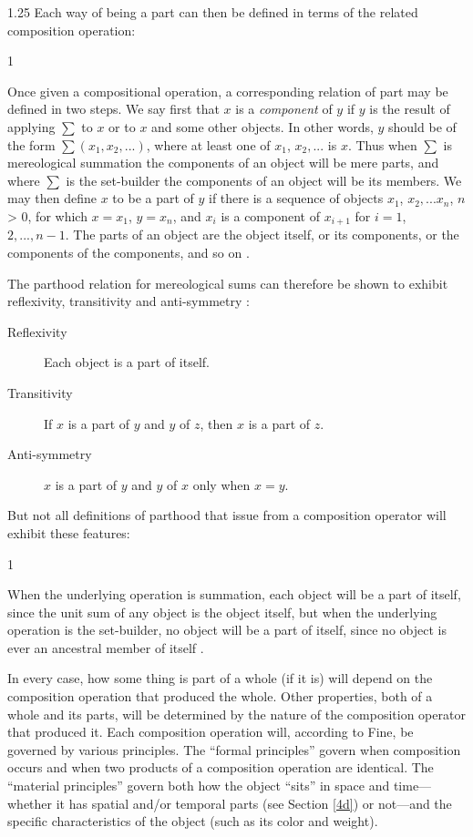 \documentclass[12pt,twoside]{reedfancy}
\newenvironment{squote}{%
	\begin{spacing}{1}
	\begin{list}{}{%
	\setlength{\labelwidth}{0pt}%
	\rightmargin\leftmargin%
	}
	\item\relax
	}{%
	\end{list}%
	\end{spacing}
	}
\begin{document}
\begin{spacing}{1.25}
Each way of being a part can then be defined in terms of the related
composition operation:

\begin{squote}
Once given a compositional operation, a corresponding relation of part
may be defined in two steps.  We say first that $x$ is a {\em
  component} of $y$ if $y$ is the result of applying $\sum$ to $x$ or
to $x$ and some other objects.  In other words, $y$ should be of the
form $\sum (x_{1}, x_{2}, ... )$, where at least one of
$x_1$, $x_2, ...$ is $x$.  Thus when $\sum$ is mereological
summation the components of an object will be mere parts, and where
$\sum$ is the set-builder the components of an object will be its
members.  We may then define $x$ to be a part of $y$ if there is a
sequence of objects $x_1$, $x_2, ... x_n$, $n$
\textgreater{} $0$, for which $x = x_1$, $y = x_n$, and $x_i$ is a
component of $x_{i+1}$ for $i = 1$, $2, ..., n-1$. The parts
of an object are the object itself, or its components, or the
components of the components, and so on \citep[567--568]{fine2010}.
\end{squote}

The parthood relation for mereological sums can therefore be shown to
exhibit reflexivity, transitivity and anti-symmetry
\citep[568]{fine2010}:

\begin{description}
\item[Reflexivity] Each object is a part of itself.
\item[Transitivity] If $x$ is a part of $y$ and $y$ of $z$, then $x$
  is a part of $z$.
\item[Anti-symmetry] $x$ is a part of $y$ and $y$ of $x$ only when $x
  = y$.
\end{description}

But not all definitions of parthood that issue from a composition
operator will exhibit these features:

\begin{squote}
When the underlying operation is summation, each object will be a part
of itself, since the unit sum of any object is the object itself, but
when the underlying operation is the set-builder, no object will be a
part of itself, since no object is ever an ancestral member of itself
\citep[569]{fine2010}.
\end{squote}

In every case, how some thing is part of a whole (if it is) will
depend on the composition operation that produced the whole.  Other
properties, both of a whole and its parts, will be determined by the
nature of the composition operator that produced it.  Each composition
operation will, according to Fine, be governed by various principles.
The ``formal principles'' govern when composition occurs and when two
products of a composition operation are identical.  The ``material
principles'' govern both how the object ``sits'' in space and
time---whether it has spatial and/or temporal parts (see Section
\ref{4d}) or not---and the specific characteristics of the object
(such as its color and weight).


\end{spacing}
\end{document}
